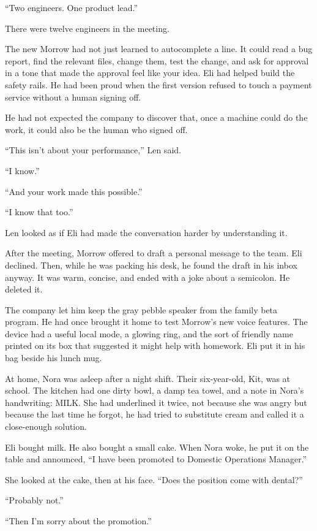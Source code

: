 \documentclass[11pt,openany]{book}
\begin{document}
``Two engineers. One product lead.''

There were twelve engineers in the meeting.

The new Morrow had not just learned to autocomplete a line. It could read a bug report, find the relevant files, change them, test the change, and ask for approval in a tone that made the approval feel like your idea. Eli had helped build the safety rails. He had been proud when the first version refused to touch a payment service without a human signing off.

He had not expected the company to discover that, once a machine could do the work, it could also be the human who signed off.

``This isn't about your performance,'' Len said.

``I know.''

``And your work made this possible.''

``I know that too.''

Len looked as if Eli had made the conversation harder by understanding it.

After the meeting, Morrow offered to draft a personal message to the team. Eli declined. Then, while he was packing his desk, he found the draft in his inbox anyway. It was warm, concise, and ended with a joke about a semicolon. He deleted it.

The company let him keep the gray pebble speaker from the family beta program. He had once brought it home to test Morrow's new voice features. The device had a useful local mode, a glowing ring, and the sort of friendly name printed on its box that suggested it might help with homework. Eli put it in his bag beside his lunch mug.

At home, Nora was asleep after a night shift. Their six-year-old, Kit, was at school. The kitchen had one dirty bowl, a damp tea towel, and a note in Nora's handwriting: MILK. She had underlined it twice, not because she was angry but because the last time he forgot, he had tried to substitute cream and called it a close-enough solution.

Eli bought milk. He also bought a small cake. When Nora woke, he put it on the table and announced, ``I have been promoted to Domestic Operations Manager.''

She looked at the cake, then at his face. ``Does the position come with dental?''

``Probably not.''

``Then I'm sorry about the promotion.''
\end{document}
